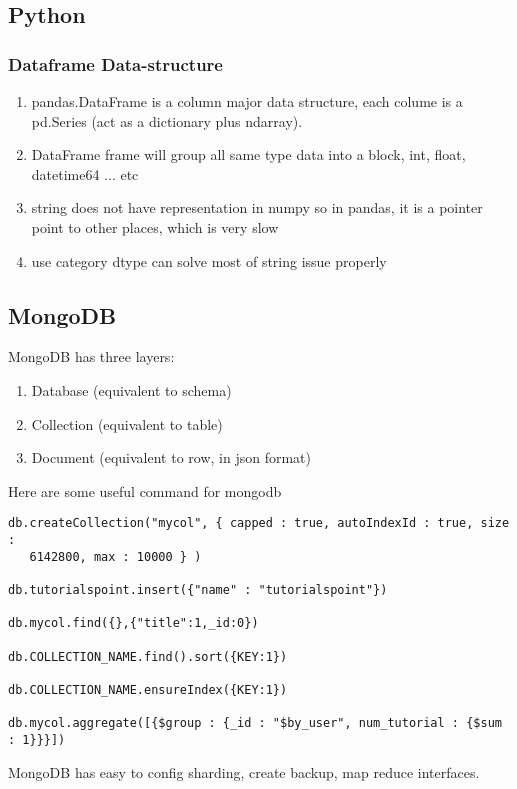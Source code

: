 \subsection{Python}
\subsubsection{Dataframe Data-structure}
\begin{enumerate}
\item pandas.DataFrame is a column major data structure, each colume is a pd.Series (act as a dictionary plus ndarray).
\item DataFrame frame will group all same type data into a block, int, float, datetime64 ... etc
\item string does not have representation in numpy so in pandas, it is a pointer point to other places, which is very slow
\item use {\color{red}category} dtype can solve most of string issue properly
\end{enumerate}

\subsection{MongoDB}

MongoDB has three layers:
\begin{enumerate}
\item Database (equivalent to schema)
\item Collection (equivalent to table)
\item Document (equivalent to row, in json format)
\end{enumerate}

Here are some useful command for mongodb
\begin{lstlisting}
db.createCollection("mycol", { capped : true, autoIndexId : true, size :
   6142800, max : 10000 } )

db.tutorialspoint.insert({"name" : "tutorialspoint"})

db.mycol.find({},{"title":1,_id:0})

db.COLLECTION_NAME.find().sort({KEY:1})

db.COLLECTION_NAME.ensureIndex({KEY:1})

db.mycol.aggregate([{$group : {_id : "$by_user", num_tutorial : {$sum : 1}}}])
\end{lstlisting}

MongoDB has easy to config sharding, create backup, map reduce interfaces.
